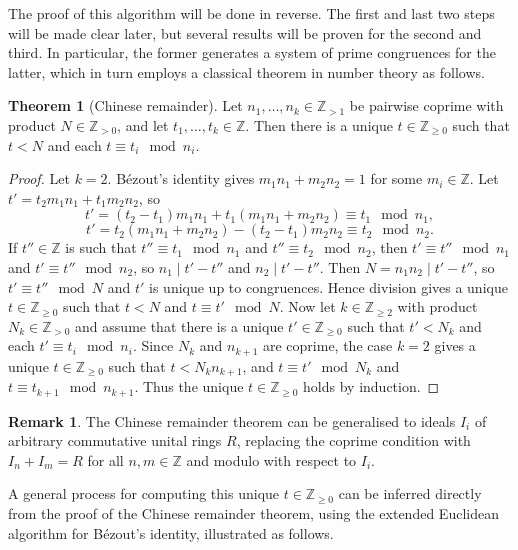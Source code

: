 \documentclass{article}
\newcommand{\Z}{\mathbb{Z}}
\newcommand{\rb}[1]{\left( #1 \right)}
\theoremstyle{definition}
\newtheorem*{remark}{Remark}
\newtheorem{theorem}[proposition]{Theorem}
\begin{document}
The proof of this algorithm will be done in reverse. The first and last two steps will be made clear later, but several results will be proven for the second and third. In particular, the former generates a system of prime congruences for the latter, which in turn employs a classical theorem in number theory as follows.

\begin{theorem}[Chinese remainder]
Let $ n_1, \dots, n_k \in \Z_{> 1} $ be pairwise coprime with product $ N \in \Z_{> 0} $, and let $ t_1, \dots, t_k \in \Z $. Then there is a unique $ t \in \Z_{\ge 0} $ such that $ t < N $ and each $ t \equiv t_i \mod n_i $.
\end{theorem}

\begin{proof}
Let $ k = 2 $. B\'ezout's identity gives $ m_1n_1 + m_2n_2 = 1 $ for some $ m_i \in \Z $. Let $ t' = t_2m_1n_1 + t_1m_2n_2 $, so
$$ t' = \rb{t_2 - t_1}m_1n_1 + t_1\rb{m_1n_1 + m_2n_2} \equiv t_1 \mod n_1, $$
$$ t' = t_2\rb{m_1n_1 + m_2n_2} - \rb{t_2 - t_1}m_2n_2 \equiv t_2 \mod n_2. $$
If $ t'' \in \Z $ is such that $ t'' \equiv t_1 \mod n_1 $ and $ t'' \equiv t_2 \mod n_2 $, then $ t' \equiv t'' \mod n_1 $ and $ t' \equiv t'' \mod n_2 $, so $ n_1 \mid t' - t'' $ and $ n_2 \mid t' - t'' $. Then $ N = n_1n_2 \mid t' - t'' $, so $ t' \equiv t'' \mod N $ and $ t' $ is unique up to congruences. Hence division gives a unique $ t \in \Z_{\ge 0} $ such that $ t < N $ and $ t \equiv t' \mod N $. Now let $ k \in \Z_{\ge 2} $ with product $ N_k \in \Z_{> 0} $ and assume that there is a unique $ t' \in \Z_{\ge 0} $ such that $ t' < N_k $ and each $ t' \equiv t_i \mod n_i $. Since $ N_k $ and $ n_{k + 1} $ are coprime, the case $ k = 2 $ gives a unique $ t \in \Z_{\ge 0} $ such that $ t < N_kn_{k + 1} $, and $ t \equiv t' \mod N_k $ and $ t \equiv t_{k + 1} \mod n_{k + 1} $. Thus the unique $ t \in \Z_{\ge 0} $ holds by induction.
\end{proof}

\begin{remark}
The Chinese remainder theorem can be generalised to ideals $ I_i $ of arbitrary commutative unital rings $ R $, replacing the coprime condition with $ I_n + I_m = R $ for all $ n, m \in \Z $ and modulo with respect to $ I_i $.
\end{remark}

A general process for computing this unique $ t \in \Z_{\ge 0} $ can be inferred directly from the proof of the Chinese remainder theorem, using the extended Euclidean algorithm for B\'ezout's identity, illustrated as follows.
\end{document}
